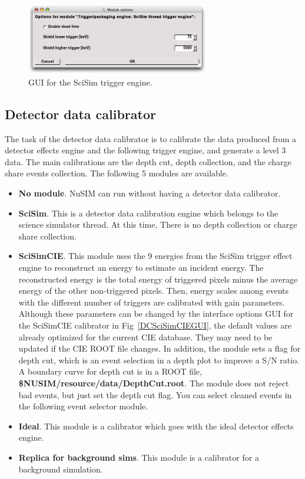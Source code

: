 \begin{figure}[tb]
 \begin{center}
  \includegraphics[width=8cm]{images/TriggerEngineSciSimGUI.png}
  \caption{GUI for the SciSim trigger engine.}
  \label{TESciSimGUI}
 \end{center}
\end{figure}

\subsection{Detector data calibrator}

The task of the detector data calibrator is to calibrate the data
produced from a detector effects engine and the following trigger
engine, and generate a level 3 data.
The main calibrations are the depth cut, depth collection, and
the charge share events collection. The following 5 modules are
available.
\begin{itemize}
 \item \textbf{No module}.
       NuSIM can run without having a detector data calibrator.
 \item \textbf{SciSim}.
       This is a detector data calibration engine which belongs to
       the science simulator thread. At this time, There is no
       depth collection or charge share collection.
 \item \textbf{SciSimCIE}.
       This module uses the 9 energies from the SciSim trigger effect
       engine to reconstruct an energy to estimate an incident energy.
       The reconstructed energy is the total energy of triggered pixels
       minus the average energy of the other non-triggered pixels.
       Then, energy scales among events with the different number of
       triggers are calibrated with gain parameters. Although these
       parameters can be changed by the interface options GUI for the
       SciSimCIE calibrator in Fig~\ref{DCSciSimCIEGUI}, the default
       values are already optimized for the current CIE database.
       They may need to be updated if the CIE ROOT file changes.
       In addition, the module sets a flag for depth cut, which is
       an event selection in a depth plot to improve a S/N ratio.
       A boundary curve for depth cut is in a ROOT file,
       \textbf{\${NUSIM}/resource/data/DepthCut.root}.
       The module does not reject bad events, but just set the depth
       cut flag. You can select cleaned events in the following
       event selector module.
 \item \textbf{Ideal}.
       This module is a calibrator which goes with the ideal
       detector effects engine.
 \item \textbf{Replica for background sims}.
       This module is a calibrator for a background simulation.
\end{itemize}

